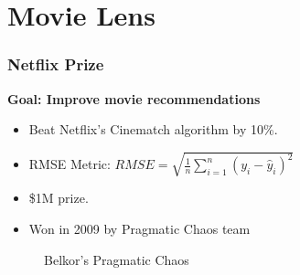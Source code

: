\documentclass[table]{beamer}
\begin{document}
\section{Movie Lens}



\begin{frame}
\frametitle{Netflix Prize}
  \textbf{Goal: Improve movie recommendations }
  \begin{itemize}
    \item Beat Netflix's Cinematch algorithm by 10\%.
    \item RMSE Metric: 
      $ RMSE = \sqrt{\frac{1}{n} \sum_{i=1}^{n} \left(y_i - \hat{y}_i \right)^2}$
    \item \$1M prize.
    \item Won in 2009 by Pragmatic Chaos team
  \end{itemize}

\begin{figure}
  \caption{Belkor's Pragmatic Chaos}
\end{figure}
\end{frame}
\end{document}
